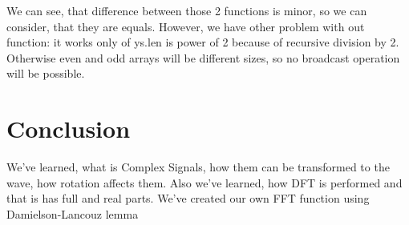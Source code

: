 \documentclass[a4paper]{article}
\begin{document}
        We can see, that difference between those 2 functions is minor, so we can consider, that they are equals. However, we have other problem with out function: it works only of ys.len is power of 2 because of recursive division by 2. Otherwise even and odd arrays will be different sizes, so no broadcast operation will be possible.
            
    \newpage
        \section{Conclusion}
            We've learned, what is Complex Signals, how them can be transformed to the wave, how rotation affects them. Also we've learned, how DFT is performed and that is has full and real parts. We've created our own FFT function using Damielson-Lancouz lemma
     
\end{document}
